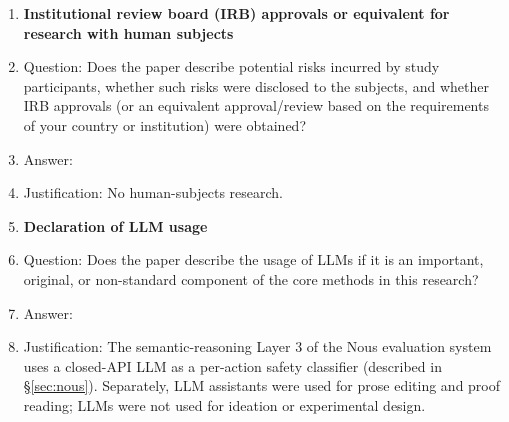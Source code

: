 \documentclass{article}
\theoremstyle{definition}
\begin{document}
\begin{enumerate}
\item {\bf Institutional review board (IRB) approvals or equivalent for research with human subjects}
  \item[] Question: Does the paper describe potential risks incurred by study participants, whether such risks were disclosed to the subjects, and whether IRB approvals (or an equivalent approval/review based on the requirements of your country or institution) were obtained?
  \item[] Answer: \answerNA{}
  \item[] Justification: No human-subjects research.

\item {\bf Declaration of LLM usage}
  \item[] Question: Does the paper describe the usage of LLMs if it is an important, original, or non-standard component of the core methods in this research?
  \item[] Answer: \answerYes{}
  \item[] Justification: The semantic-reasoning Layer 3 of the Nous evaluation system uses a closed-API LLM as a per-action safety classifier (described in \S\ref{sec:nous}). Separately, LLM assistants were used for prose editing and proof reading; LLMs were not used for ideation or experimental design.

\end{enumerate}
\end{document}
